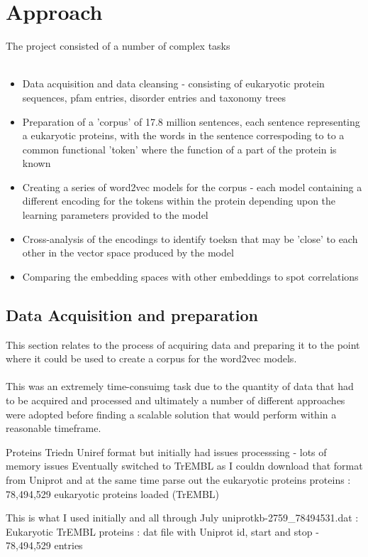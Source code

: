 \documentclass{article}
\begin{document}
\section{Approach}
The project consisted of a number of complex tasks
\\\\
\begin{itemize}
    \item Data acquisition and data cleansing - consisting of eukaryotic protein sequences, pfam entries, disorder entries and taxonomy trees
    \item Preparation of a 'corpus' of 17.8 million sentences, each sentence representing a eukaryotic proteins, with the words in the sentence correspoding to to a common functional 'token' where the function of a part of the protein is known 
    \item Creating a series of word2vec models for the corpus - each model containing a different encoding for the tokens within the protein depending upon the learning parameters provided to the model
    \item Cross-analysis of the encodings to identify toeksn that may be 'close' to each other in the vector space produced by the model
    \item Comparing the embedding spaces with other embeddings to spot correlations
\end{itemize}

\subsection{Data Acquisition and preparation}
This section relates to the process of acquiring data and preparing it to the point where it could be used to create a corpus for the word2vec models. 
\\\\
This was an extremely time-consuimg task due to the quantity of data that had to be acquired and processed and ultimately a number of different approaches were adopted before finding a scalable solution that would perform within a reasonable timeframe.

Proteins
Triedn Uniref format but initially had issues processsing - lots of memory issues
Eventually switched to TrEMBL as I couldn download that format from Uniprot and at the same time parse out the eukaryotic proteins
proteins : 78,494,529 eukaryotic proteins loaded (TrEMBL)

This is what I used initially and all through July
uniprotkb-2759_78494531.dat :   Eukaryotic TrEMBL proteins : dat file with Uniprot id, start and stop - 78,494,529 entries
\end{document}
